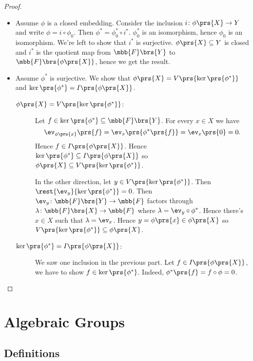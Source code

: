 \documentclass[10pt,a4paper,twoside,openany,hidelinks]{book}
\begin{document}
\begin{proof}
\begin{itemize}
\item Assume $\phi$ is a closed embedding. Consider the inclusion $i \colon \phi\prs{X} \to Y$ and write $\phi = i \circ \phi_0$. Then $\phi^* = \phi_0^* \circ i^*$. $\phi_0^*$ is an isomorphism, hence $\phi_0$ is an isomorphism. We're left to show that $i^*$ is surjective.
$\phi\prs{X} \subseteq Y$ is closed and $i^*$ is the quotient map from $\mbb{F}\brs{Y}$ to $\mbb{F}\brs{\phi\prs{X}}$, hence we get the result.

\item
Assume $\phi^*$ is surjective. We show that $\phi\prs{X} = V\prs{\ker\prs{\phi^*}}$ and $\ker\prs{\phi^*} = I\prs{\phi\prs{X}}$.

\begin{description}
\item[$\phi\prs{X} = V\prs{\ker\prs{\phi^*}}$:]
Let $f \in \ker\prs{\phi^*} \subseteq \mbb{F}\brs{Y}$. For every $x \in X$ we have
\[\ev_{\phi\prs{x}}\prs{f} = \ev_x \prs{\phi^*\prs{f}} = \ev_x\prs{0} = 0\text{.}\]
Hence $f \in I\prs{\phi\prs{X}}$. Hence $\ker\prs{\phi^*} \subseteq I\prs{\phi\prs{X}}$ so
$\phi\prs{X} \subseteq V\prs{\ker\prs{\phi^*}}$.

In the other direction, let $y \in V\prs{\ker\prs{\phi^*}}$. Then $\rest{\ev_y}{\ker\prs{\phi^*}} = 0$. Then $\ev_y \colon \mbb{F}\brs{Y} \to \mbb{F}$ factors through $\lambda \colon \mbb{F}\brs{X} \to \mbb{F}$ where $\lambda = \ev_y \circ \phi^*$. Hence there's $x \in X$ such that $\lambda = \ev_x$. Hence $y = \phi\prs{x} \in \phi\prs{X}$ so $V\prs{\ker\prs{\phi^*}} \subseteq \phi\prs{X}$.

\item[$\ker\prs{\phi^*} = I\prs{\phi\prs{X}}$:]
We saw one inclusion in the previous part. Let $f \in I\prs{\phi\prs{X}}$, we have to show $f \in \ker\prs{\phi^*}$. Indeed, $\phi^*\prs{f} = f \circ \phi = 0$.
\end{description}
\end{itemize}
\end{proof}

\section{Algebraic Groups}

\subsection{Definitions}
\end{document}
